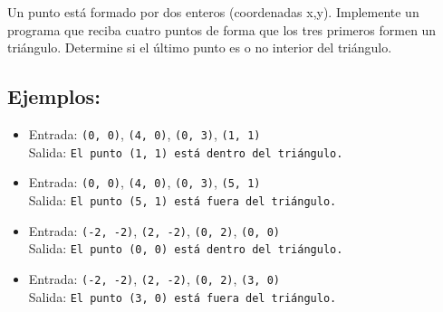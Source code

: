 Un punto está formado por dos enteros (coordenadas x,y). Implemente
un programa que reciba cuatro puntos de forma que los tres primeros formen un triángulo. Determine si el último punto es o no interior del triángulo.
\subsection*{Ejemplos:}
\begin{itemize}
    \item Entrada: \texttt{(0, 0)}, \texttt{(4, 0)}, \texttt{(0, 3)}, \texttt{(1, 1)}\\
          Salida: \texttt{El punto (1, 1) está dentro del triángulo.}
    \item Entrada: \texttt{(0, 0)}, \texttt{(4, 0)}, \texttt{(0, 3)}, \texttt{(5, 1)}\\
          Salida: \texttt{El punto (5, 1) está fuera del triángulo.}
    \item Entrada: \texttt{(-2, -2)}, \texttt{(2, -2)}, \texttt{(0, 2)}, \texttt{(0, 0)}\\
          Salida: \texttt{El punto (0, 0) está dentro del triángulo.}
    \item Entrada: \texttt{(-2, -2)}, \texttt{(2, -2)}, \texttt{(0, 2)}, \texttt{(3, 0)}\\
          Salida: \texttt{El punto (3, 0) está fuera del triángulo.}
\end{itemize}
